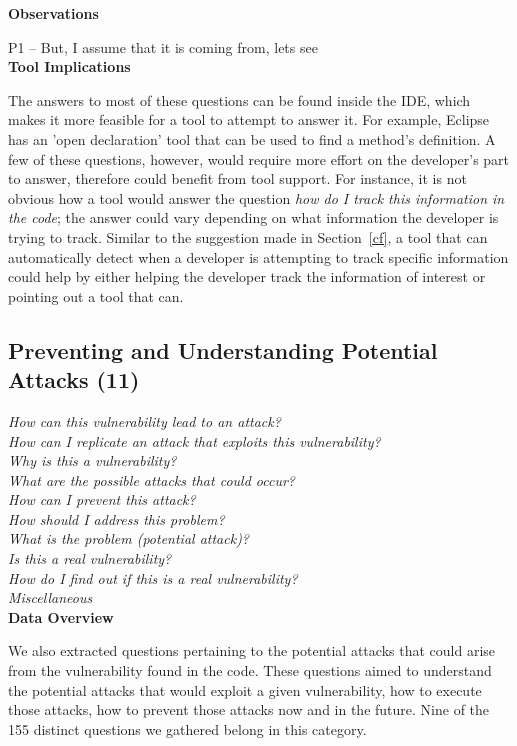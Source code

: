 \documentclass[conference]{IEEEtran}
\begin{document}
\noindent\textbf{Observations}

P1 -- But, I assume that it is coming from, lets see
\\

\noindent\textbf{Tool Implications}

The answers to most of these questions can be found inside the IDE, which makes it more feasible for a tool to attempt to answer it. For example, Eclipse has an 'open declaration' tool that can be used to find a method's definition. A few of these questions, however, would require more effort on the developer's part to answer, therefore could benefit from tool support. For instance, it is not obvious how a tool would answer the question \emph{how do I track this information in the code}; the answer could vary depending on what information the developer is trying to track.
Similar to the suggestion made in Section~\ref{cf}, a tool that can automatically detect when a developer is attempting to track specific information could help by either helping the developer track the information of interest or pointing out a tool that can.



\noindent\subsection{\textbf{Preventing and Understanding Potential Attacks (11)}}\label{pupa}

\noindent\emph{How can this vulnerability lead to an attack?} \\
\emph{How can I replicate an attack that exploits this vulnerability?} \\
\emph{Why is this a vulnerability?} \\
\emph{What are the possible attacks that could occur?} \\
\emph{How can I prevent this attack?} \\
\emph{How should I address this problem? } \\
\emph{What is the problem (potential attack)?} \\
\emph{Is this a real vulnerability?} \\
\emph{How do I find out if this is a real vulnerability?} \\
\emph{Miscellaneous} \\

\noindent\textbf{Data Overview}

We also extracted questions pertaining to the potential attacks that could arise from the vulnerability found in the code. 
These questions aimed to understand the potential attacks that would exploit a given vulnerability, how to execute those attacks, how to prevent those attacks now and in the future. 
Nine of the 155 distinct questions we gathered belong in this category.
\\
\end{document}
